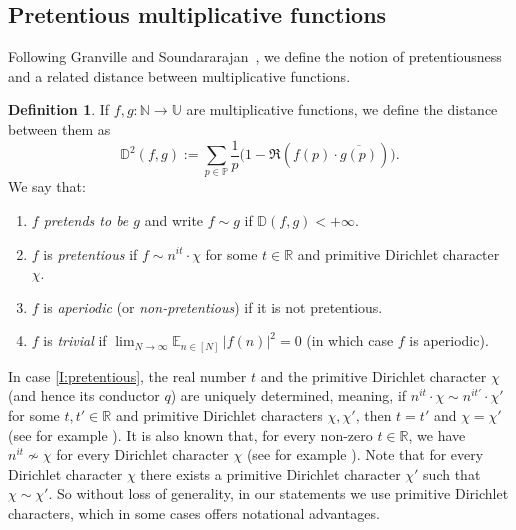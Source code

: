 \documentclass[11pt]{amsart}
\theoremstyle{definition}
\newtheorem{definition}{Definition}[section]
\newcommand{\E}{{\mathbb E}}
\newcommand{\D}{{\mathbb D}}
\newcommand{\N}{{\mathbb N}}
\renewcommand{\P}{{\mathbb P}}
\newcommand{\R}{{\mathbb R}}
\newcommand{\U}{{\mathbb U}}
\begin{document}
\subsection{Pretentious multiplicative functions}\label{SS:pretentious}
Following Granville and Soundararajan~\cite{GS07,GS08,GS23}, we define the notion of pretentiousness
and a related distance between multiplicative functions.
\begin{definition}\label{D:Pretentious}
If  $f,g\colon \N\to \U$ are multiplicative functions, we define the distance between them as
\begin{equation}\label{E:D}
	\D^2(f,g):=\sum_{p\in \P} \frac{1}{p} \big(1-\Re(f(p)\cdot \overline{g(p)})\big).
\end{equation}
We say that:
\begin{enumerate}
\item  {\em $f$ pretends to be $g$} and write $f\sim g$  if  $\D(f,g)<+\infty$.

\smallskip

\item \label{I:pretentious} $f$ is {\em pretentious} if  $f\sim n^{it}\cdot \chi$ for some $t\in \R$ and primitive  Dirichlet character $\chi$.

\smallskip

\item $f$ is  {\em aperiodic} (or {\em non-pretentious})  if  it is not pretentious.

\smallskip

\item $f$ is {\em trivial} if  $\lim_{N\to\infty}\E_{n\in [N]}\, |f(n)|^2=0$ (in which case $f$ is aperiodic).
\end{enumerate}
\end{definition}
In case \eqref{I:pretentious}, the real number $t$  and the primitive Dirichlet character $\chi$  (and hence its conductor $q$) are uniquely determined, meaning, if  $n^{it}\cdot \chi\sim n^{it'}\cdot \chi'$ for some $t,t'\in \R$ and primitive Dirichlet characters  $\chi,\chi'$, then $t=t'$ and $\chi=\chi'$ (see for example \cite[Proposition~6.2.3]{M18}).
 It is also known that, for every non-zero $t\in \R$, we have  $n^{it}\not\sim \chi$ for every Dirichlet character $\chi$ (see for example \cite[Corollary~11.4]{GS23}). 
 Note that for every Dirichlet character $\chi$ there exists a primitive Dirichlet character $\chi'$ such that $\chi\sim \chi'$. So without loss of generality, in our statements we use primitive Dirichlet characters, which in 
 some cases offers notational advantages. 
 
\end{document}
